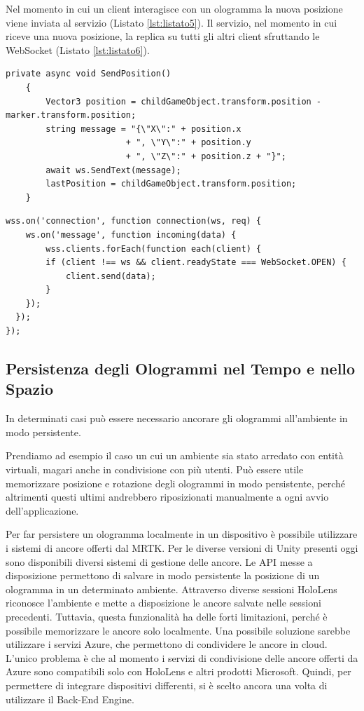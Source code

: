 Nel momento in cui un client interagisce con un ologramma la nuova posizione viene inviata al servizio (Listato \ref{lst:listato5}).
Il servizio, nel momento in cui riceve una nuova posizione, la replica su tutti gli altri client sfruttando le WebSocket (Listato \ref{lst:listato6}).

\lstset{language=[Sharp]C, numbers=left}
\begin{lstlisting}[caption={Il client manda la nuova posizione dell'ologramma la servizio.}, label=lst:listato5]
    private async void SendPosition()
    {
        Vector3 position = childGameObject.transform.position - marker.transform.position;
        string message = "{\"X\":" + position.x
                        + ", \"Y\":" + position.y
                        + ", \"Z\":" + position.z + "}";
        await ws.SendText(message);
        lastPosition = childGameObject.transform.position;
    }
\end{lstlisting}

\lstset{language=[Sharp]C, numbers=left}
\begin{lstlisting}[caption={Il servizio replica la nuova posizione ricevuta su tutti gli altri client.}, label=lst:listato6]
wss.on('connection', function connection(ws, req) {
    ws.on('message', function incoming(data) {
        wss.clients.forEach(function each(client) {
        if (client !== ws && client.readyState === WebSocket.OPEN) {
            client.send(data);
        }
    });
  });
});
\end{lstlisting}

\subsection{Persistenza degli Ologrammi nel Tempo e nello Spazio}
In determinati casi può essere necessario ancorare gli ologrammi all'ambiente in modo persistente.

Prendiamo ad esempio il caso un cui un ambiente sia stato arredato con entità virtuali, magari anche in condivisione con più utenti.
Può essere utile memorizzare posizione e rotazione degli ologrammi in modo persistente, perché altrimenti questi ultimi andrebbero riposizionati manualmente a ogni avvio dell'applicazione.

Per far persistere un ologramma localmente in un dispositivo è possibile utilizzare i sistemi di ancore offerti dal MRTK.
Per le diverse versioni di Unity presenti oggi sono disponibili diversi sistemi di gestione delle ancore.
Le API messe a disposizione permettono di salvare in modo persistente la posizione di un ologramma in un determinato ambiente.
Attraverso diverse sessioni HoloLens riconosce l'ambiente e mette a disposizione le ancore salvate nelle sessioni precedenti.
Tuttavia, questa funzionalità ha delle forti limitazioni, perché è possibile memorizzare le ancore solo localmente.
Una possibile soluzione sarebbe utilizzare i servizi Azure, che permettono di condividere le ancore in cloud.
L'unico problema è che al momento i servizi di condivisione delle ancore offerti da Azure sono compatibili solo con HoloLens e altri prodotti Microsoft. Quindi, per permettere di integrare dispositivi differenti, si è scelto ancora una volta di utilizzare il Back-End Engine.

